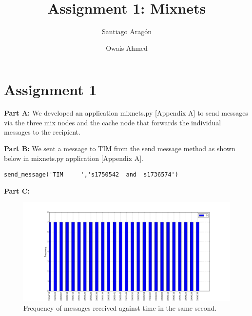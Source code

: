 \documentclass[preprint,12pt,3p]{elsarticle}
\begin{document}
\begin{frontmatter}

\title{Assignment 1: Mixnets}

\author{Santiago Aragón}
\address{s.e.aragonramirez@student.utwente.nl}

\author{Owais Ahmed}
\address{o.ahmed@student.utwente.nl}
\address{University of Twente}



\end{frontmatter}





\section*{Assignment 1}
\textbf{Part A:}
We developed an application mixnets.py [Appendix A] to send messages via the three mix nodes and the cache node that forwards the individual messages to the recipient.
\newline

\textbf{Part B:}
We sent a message to TIM from the send message method as shown below in mixnets.py application [Appendix A].
\begin{verbatim}send_message('TIM     ','s1750542  and  s1736574') \end{verbatim}

\textbf{Part C:}

\begin{figure}[h]
\caption{Frequency of messages received against time in the same second.}
\centering
\includegraphics[width=\textwidth]{one_c}
\end{figure}
\end{document}
